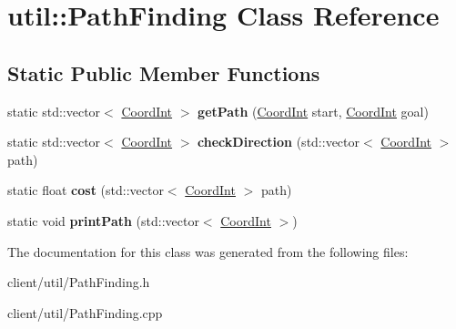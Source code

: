 \hypertarget{classutil_1_1_path_finding}{\section{util\-:\-:Path\-Finding Class Reference}
\label{classutil_1_1_path_finding}
}
\subsection*{Static Public Member Functions}
\begin{DoxyCompactItemize}
\item 
\hypertarget{classutil_1_1_path_finding_aa29790c6f3968ebd2d91d23215113184}{static std\-::vector$<$ \hyperlink{classutil_1_1_coordinates}{Coord\-Int} $>$ {\bfseries get\-Path} (\hyperlink{classutil_1_1_coordinates}{Coord\-Int} start, \hyperlink{classutil_1_1_coordinates}{Coord\-Int} goal)}\label{classutil_1_1_path_finding_aa29790c6f3968ebd2d91d23215113184}

\item 
\hypertarget{classutil_1_1_path_finding_af1db01cda73c831200c67e5620d0d057}{static std\-::vector$<$ \hyperlink{classutil_1_1_coordinates}{Coord\-Int} $>$ {\bfseries check\-Direction} (std\-::vector$<$ \hyperlink{classutil_1_1_coordinates}{Coord\-Int} $>$ path)}\label{classutil_1_1_path_finding_af1db01cda73c831200c67e5620d0d057}

\item 
\hypertarget{classutil_1_1_path_finding_aa8f69364a5ea006adc697be375b57666}{static float {\bfseries cost} (std\-::vector$<$ \hyperlink{classutil_1_1_coordinates}{Coord\-Int} $>$ path)}\label{classutil_1_1_path_finding_aa8f69364a5ea006adc697be375b57666}

\item 
\hypertarget{classutil_1_1_path_finding_af6d4d8edf3bda8c0d1a67917703799b1}{static void {\bfseries print\-Path} (std\-::vector$<$ \hyperlink{classutil_1_1_coordinates}{Coord\-Int} $>$)}\label{classutil_1_1_path_finding_af6d4d8edf3bda8c0d1a67917703799b1}

\end{DoxyCompactItemize}


The documentation for this class was generated from the following files\-:\begin{DoxyCompactItemize}
\item 
client/util/Path\-Finding.\-h\item 
client/util/Path\-Finding.\-cpp\end{DoxyCompactItemize}
